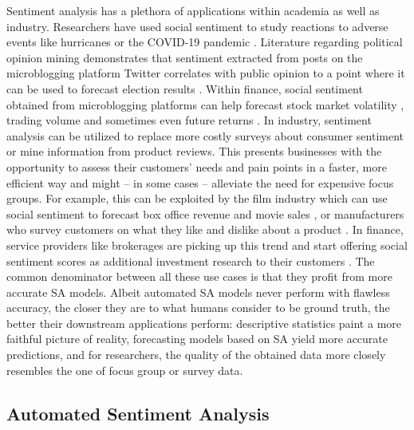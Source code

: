 Sentiment analysis has a plethora of applications within academia as well as industry. Researchers have used social sentiment to study reactions to adverse events like hurricanes  or the COVID-19 pandemic . Literature regarding political opinion mining demonstrates that sentiment extracted from posts on the microblogging platform Twitter correlates with public opinion to a point where it can be used to forecast election results .
Within finance, social sentiment obtained from microblogging platforms can help forecast stock market volatility , trading volume  and sometimes even future returns .
In industry, sentiment analysis can be utilized to replace more costly surveys about consumer sentiment or mine information from product reviews. This presents businesses with the opportunity to assess their customers' needs and pain points in a faster, more efficient way and might -- in some cases -- alleviate the need for expensive focus groups. For example, this can be exploited by the film industry which can use social sentiment to forecast box office revenue and movie sales , or manufacturers who survey customers on what they like and dislike about a product .
In finance, service providers like brokerages are picking up this trend and start offering social sentiment scores as additional investment research to their customers \cite{ibkr-sentiment}. The common denominator between all these use cases is that they profit from more accurate SA models. Albeit automated SA models never perform with flawless accuracy, the closer they are to what humans consider to be ground truth, the better their downstream applications perform: descriptive statistics paint a more faithful picture of reality, forecasting models based on SA yield more accurate predictions, and for researchers, the quality of the obtained data more closely resembles the one of focus group or survey data.


\subsection{Automated Sentiment Analysis}

